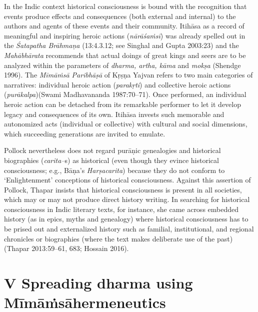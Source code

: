 In the Indic context historical consciousness is bound with the recognition that events produce effects and consequences (both external and internal) to the authors and agents of these events and their community. Itihāsa as a record of meaningful and inspiring heroic actions (\textit{nārāśaṁsī}) was already spelled out in the \textit{Śatapatha Brāhmaṇa } (13:4.3.12; see Singhal and Gupta 2003:23) and the \textit{Mahābhārata} recommends that actual doings of great kings and seers are to be analyzed within the parameters of \textit{dharma, artha, kāma} and \textit{mokṣa} (Shendge 1996). The \textit{Mīmāṁsā Paribhāṣā} of Kṛṣṇa Yajvan refers to two main categories of narratives: individual heroic action (\textit{parakṛti}) and collective heroic actions (\textit{purākalpa})(Swami Madhavananda 1987:70–71). Once performed, an individual heroic action can be detached from its remarkable performer to let it develop legacy and consequences of its own. Itihāsa invests such memorable and autonomized acts (individual or collective) with cultural and social dimensions, which succeeding generations are invited to emulate.

Pollock nevertheless does not regard purāṇic genealogies and historical biographies (\textit{carita–}s) as historical (even though they evince historical consciousness; e.g., Bāṇa’s \textit{Harṣacarita}) because they do not conform to ‘Enlightenment’ conceptions of historical consciousness. Against this assertion of Pollock, Thapar insists that historical consciousness is present in all societies, which may or may not produce direct history writing. In searching for historical consciousness in Indic literary texts, for instance, she came across embedded history (as in epics, myths and genealogy) where historical consciousness has to be prised out and externalized history such as familial, institutional, and regional chronicles or biographies (where the text makes deliberate use of the past)(Thapar 2013:59–61, 683; Hossain 2016).


\section*{V Spreading dharma using Mīmāṁsā\hfill \break hermeneutics}

